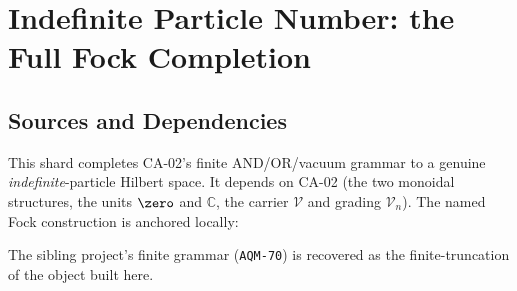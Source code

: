 
\section{Indefinite Particle Number: the Full Fock Completion}
\label{sec:indefinite-particle-fock}

\subsection{Sources and Dependencies}

This shard completes CA-02's finite AND/OR/vacuum grammar to a genuine
\emph{indefinite}-particle Hilbert space. It depends on CA-02 (the two monoidal
structures, the units $\zero$ and $\mathbb C$, the carrier $\mathcal V$ and grading
$\mathcal V_n$). The named Fock construction is anchored locally:


The sibling project's finite grammar (\texttt{AQM-70}) is recovered as the
finite-truncation of the object built here.

